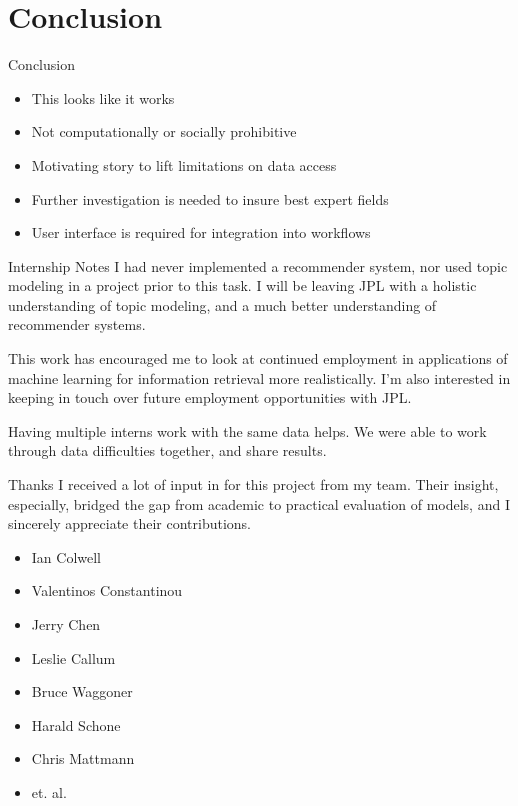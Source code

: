 \documentclass[10pt]{beamer}
\begin{document}
\section{Conclusion}

\begin{frame}{Conclusion}
  \begin{itemize}
  \item This looks like it works
  \item Not computationally or socially prohibitive
  \item Motivating story to lift limitations on data access
  \item Further investigation is needed to insure best expert fields
  \item User interface is required for integration into workflows
  \end{itemize}
\end{frame}


\begin{frame}{Internship Notes}
  I had never implemented a recommender system, nor used topic modeling in
  a project prior to this task. I will be leaving JPL with a holistic understanding
  of topic modeling, and a much better understanding of recommender systems.

\vspace{1em}

  This work has encouraged me to look at continued employment in applications of
  machine learning for information retrieval more realistically. I'm also interested
  in keeping in touch over future employment opportunities with JPL.

  \vspace{1em}

  Having multiple interns work with the same data helps. We were able to work through
  data difficulties together, and share results.
\end{frame}


\begin{frame}{Thanks}
  I received a lot of input in for this project from my team.
  Their insight, especially, bridged the gap from academic to practical evaluation of models,
  and I sincerely appreciate their contributions.

  \begin{itemize}
  \item Ian Colwell
  \item Valentinos Constantinou
  \item Jerry Chen
  \item Leslie Callum
  \item Bruce Waggoner
  \item Harald Schone
  \item Chris Mattmann
  \item[] et. al.
  \end{itemize}

\end{frame}
\end{document}
